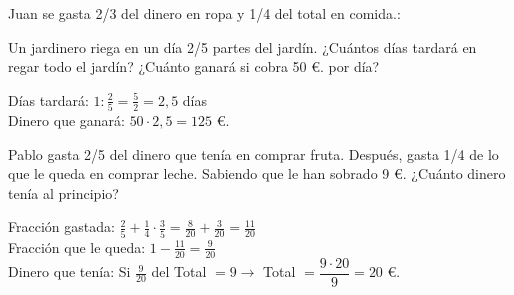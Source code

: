 \documentclass[addpoints,spanish, 12pt,a4paper]{exam}
\begin{document}
\begin{questions}
\question[3] Juan se gasta 2/3 del dinero en ropa y 1/4 del total en comida.:
\noaddpoints %
\addpoints

\question[2] Un jardinero riega en un día 2/5 partes del jardín. ¿Cuántos días tardará en regar todo el jardín? ¿Cuánto ganará si cobra 50 \euro. por día?
\begin{solution} Días tardará: $1:\frac{2}{5}=\frac{5}{2}=2,5$ días  \\
Dinero que ganará: $50\cdot2,5=125$ \euro. \end{solution}


\question[3] Pablo gasta 2/5 del dinero que tenía en comprar fruta. Después, gasta 1/4 de lo que le queda en comprar leche. Sabiendo que le han sobrado 9 \euro. ¿Cuánto dinero tenía al principio?
\begin{solution} Fracción gastada: $\frac{2}{5}+\frac{1}{4}\cdot\frac{3}{5}=\frac{8}{20}+\frac{3}{20}=\frac{11}{20}$  \\
Fracción que le queda: $1-\frac{11}{20}=\frac{9}{20}$ \\
Dinero que tenía: Si $\frac{9}{20}$ del Total $= 9\to$ Total $=\dfrac{9\cdot20}{9}=20$ \euro. \end{solution}

\addpoints


\end{questions}
\end{document}
